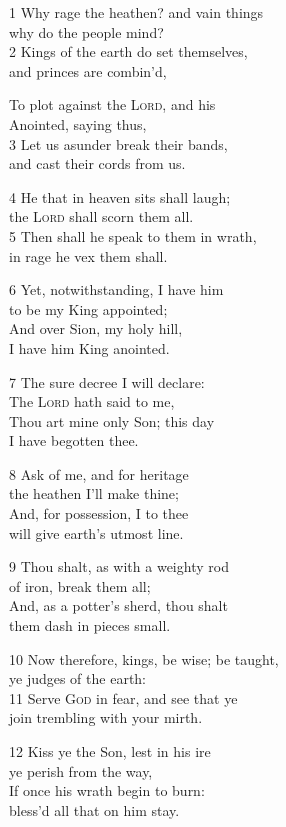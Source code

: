 1 Why rage the heathen? and vain things\\
why do the people mind?\\
2 Kings of the earth do set themselves,\\
and princes are combin’d,

To plot against the \textsc{Lord}, and his\\
Anointed, saying thus,\\
3 Let us asunder break their bands,\\
and cast their cords from us.

4 He that in heaven sits shall laugh;\\
the \textsc{Lord} shall scorn them all.\\
5 Then shall he speak to them in wrath,\\
in rage he vex them shall.

6 Yet, notwithstanding, I have him\\
to be my King appointed;\\
And over Sion, my holy hill,\\
I have him King anointed.

7 The sure decree I will declare:\\
The \textsc{Lord} hath said to me,\\
Thou art mine only Son; this day\\
I have begotten thee.

8 Ask of me, and for heritage\\
the heathen I’ll make thine;\\
And, for possession, I to thee\\
will give earth’s utmost line.

9 Thou shalt, as with a weighty rod\\
of iron, break them all;\\
And, as a potter’s sherd, thou shalt\\
them dash in pieces small.

10 Now therefore, kings, be wise; be taught, \\
ye judges of the earth:\\
11 Serve \textsc{God} in fear, and see that ye\\
join trembling with your mirth.

12 Kiss ye the Son, lest in his ire \\
ye perish from the way, \\
If once his wrath begin to burn: \\
bless’d all that on him stay.

